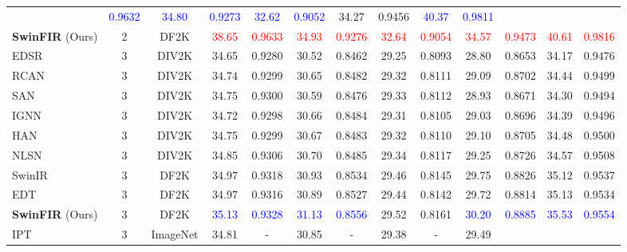 \documentclass[10pt,twocolumn,letterpaper]{article}
\begin{document}
\begin{table*}[!t]
{\begin{tabular}{lcccccccccccc}
			& \textcolor{blue}{0.9632}
			& \textcolor{blue}{34.80}
			& \textcolor{blue}{0.9273}
			& \textcolor{blue}{32.62}
			& \textcolor{blue}{0.9052}
			& 34.27
			& 0.9456
			& \textcolor{blue}{40.37}
			& \textcolor{blue}{0.9811}
			\\
			\textbf{SwinFIR} (Ours) & 2 & DF2K & \textcolor{red}{38.65}
			& \textcolor{red}{0.9633}
			& \textcolor{red}{34.93}
			& \textcolor{red}{0.9276}
			& \textcolor{red}{32.64}
			& \textcolor{red}{0.9054}
			& \textcolor{red}{34.57}
			& \textcolor{red}{0.9473}
			& \textcolor{red}{40.61}
			& \textcolor{red}{0.9816}
			\\
			\hline
			\hline
			EDSR & 3 & DIV2K & 34.65
			& 0.9280
			& 30.52
			& 0.8462
			& 29.25
			& 0.8093
			& 28.80
			& 0.8653
			& 34.17
			& 0.9476
			\\
			RCAN & 3 & DIV2K & 34.74
			& 0.9299
			& 30.65
			& 0.8482
			& 29.32
			& 0.8111
			& 29.09
			& 0.8702
			& 34.44
			& 0.9499
			\\
			SAN & 3 & DIV2K & {34.75}
			& {0.9300}
			& {30.59}
			& {0.8476}
			& {29.33}
			& {0.8112}
			& {28.93}
			& {0.8671}
			& {34.30}
			& {0.9494}
			\\
			IGNN & 3 & DIV2K & {34.72}
			& {0.9298}
			& {30.66}
			& {0.8484}
			& {29.31}
			& {0.8105}
			& {29.03}
			& {0.8696}
			& {34.39}
			& {0.9496}
			\\
			HAN  & 3 & DIV2K & {34.75}
			& {0.9299}
			& {30.67}
			& {0.8483}
			& {29.32}
			& {0.8110}
			& {29.10}
			& {0.8705}
			& {34.48}
			& {0.9500}
			\\
			NLSN & 3 & DIV2K & 34.85 
			& 0.9306 
			& 30.70 
			& 0.8485 
			& 29.34 
			& 0.8117 
			& {29.25}
			& {0.8726}
			& 34.57 
			& 0.9508  
			\\
			SwinIR & 3 & DF2K & 34.97
			& 0.9318
			& 30.93
			& 0.8534
			& 29.46
			& 0.8145
			& 29.75
			& 0.8826
			& 35.12
			& 0.9537
			\\
			EDT & 3 & DF2K & 34.97
			& 0.9316
			& 30.89
			& 0.8527
			& 29.44
			& 0.8142
			& 29.72
			& 0.8814
			& 35.13
			& 0.9534
			\\
			\textbf{SwinFIR} (Ours) & 3 & DF2K & \textcolor{blue}{35.13}
			& \textcolor{blue}{0.9328}
			& \textcolor{blue}{31.13}
			& \textcolor{blue}{0.8556}
			& 29.52
			& 0.8161
			& \textcolor{blue}{30.20}
			& \textcolor{blue}{0.8885}
			& \textcolor{blue}{35.53}
			& \textcolor{blue}{0.9554}
			\\
			\hdashline
			IPT & 3 & ImageNet & {34.81}
			& {-}
			& {30.85}
			& {-}
			& {29.38}
			& {-}
			& {29.49}

\end{tabular}}
\end{table*}
\end{document}
